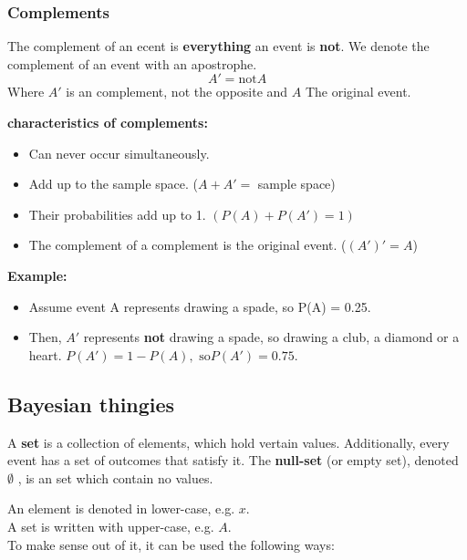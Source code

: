 \documentclass{article}
\begin{document}
\subsubsection{Complements}
The complement of an ecent is \textbf{everything} an event is \textbf{not}. We
denote the complement of an event with an apostrophe.
\[A\prime = \text{not} A\]
Where $A\prime$ is an complement, not the opposite and $A$ The original event.

\textbf{characteristics of complements:}
\begin{itemize}
  \item Can never occur simultaneously.
  \item Add up to the sample space. ($A + A\prime =$ sample space)
  \item Their probabilities add up to 1. $(P(A)+P(A\prime)=1)$
  \item The complement of a complement is the original event. ($(A\prime)\prime = A$)
\end{itemize}

\textbf{Example:}
\begin{itemize}
  \item Assume event A represents drawing a spade, so P(A) = 0.25.
  \item Then, $A\prime$ represents \textbf{not} drawing a spade, so drawing a
    club, a diamond or a heart. $P(A\prime)=1-P(A),\text{ so} P(A\prime)=0.75$.
\end{itemize}



\subsection{Bayesian thingies}
A \textbf{set} is a collection of elements, which hold vertain values.
Additionally, every event has a set of outcomes that satisfy it.
The \textbf{null-set} (or empty set), denoted $\emptyset$ , is an set which
contain no values.

An element is denoted in lower-case, e.g. $x$.\\
A set is written with upper-case, e.g. $A$.\\
To make sense out of it, it can be used the following ways:\\
\end{document}
